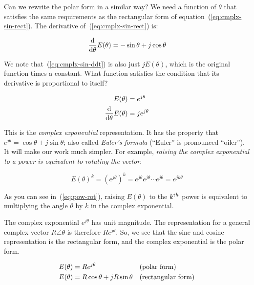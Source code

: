 Can we rewrite the polar form in a similar way? We need
a function of $\theta$ that satisfies the same requirements as the
rectangular form of equation~(\ref{eq:cmplx-sin-rect}). The derivative
of~(\ref{eq:cmplx-sin-rect}) is:

\begin{equation}
\frac{\mathrm{d} }{\mathrm{d} \theta} E(\theta) = -\sin\theta + j\cos\theta
\label{eq:cmplx-sin-ddt}
\end{equation}

We note that~(\ref{eq:cmplx-sin-ddt}) is also just $jE(\theta)$, which
is the original function times a constant. What function satisfies the
condition that its derivative is proportional to itself? 

\begin{align}
E(\theta) &=  e^{j\theta} \\ \label{eq:cmplx-sin}
\frac{\mathrm{d} }{\mathrm{d} \theta} E(\theta) &=  je^{j\theta}
\end{align}

This is the \emph{complex exponential} representation. It has the
property that $e^{j\theta} = \cos\theta + j\sin\theta$; also called
\emph{Euler's formula} (``Euler'' is pronounced ``oiler''). It will
 make our work much simpler.  For
example, \emph{raising the complex exponential to a power is equivalent
to rotating the vector}:

\begin{equation}
E(\theta)^k = \left( e^{j\theta} \right) ^k
            = e^{j\theta} e^{j\theta} \cdots e^{j\theta}
            = e^{jk\theta} \label{eq:pow-rot}
\end{equation}

As you can see in~(\ref{eq:pow-rot}), raising $E(\theta)$ to the
$k^{\textrm th}$ power is equivalent to multiplying the angle $\theta$
by $k$ in the complex exponential.

The complex exponential $e^{j\theta}$ has unit
magnitude.  The representation for a general complex vector $R\angle\theta$
is therefore $Re^{j\theta}$. So, we see that the sine and cosine
representation is the rectangular form, and the complex exponential is
the polar form.

\begin{align} \centering
	E(\theta) &= Re^{j\theta} && \text{(polar form)} \\
	E(\theta) &= R\cos\theta+jR\sin\theta && \text{(rectangular form)}
\end{align}

